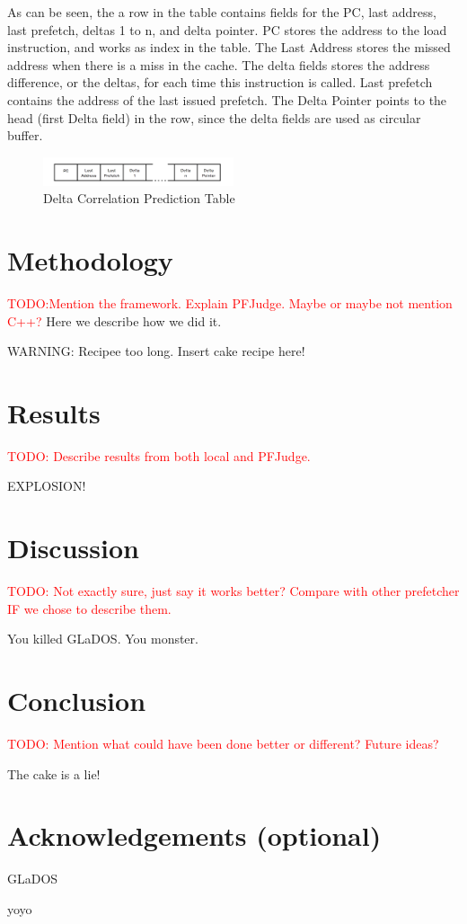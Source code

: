 \documentclass[a4paper]{IEEEtran}
\newcommand\TODO[1]{\textcolor{red}{TODO:#1}}
\newcommand\todo[1]{\TODO{#1}}
\begin{document}
As can be seen, the a row in the table contains fields for the PC, last address, last prefetch, deltas 1 to n, and delta pointer.
PC stores the address to the load instruction, and works as index in the table.
The Last Address stores the missed address when there is a miss in the cache.
The delta fields stores the address difference, or the deltas, for each time this instruction is called.
Last prefetch contains the address of the last issued prefetch.
The Delta Pointer points to the head (first Delta field) in the row, since the delta fields are used as circular buffer.

\begin{figure}[h!]
  \centering
      \includegraphics[width=0.5\textwidth]{Figures/DCTable}
  \caption{Delta Correlation Prediction Table}
  \label{fig:DCTable}
\end{figure}

\section{Methodology}

\todo{Mention the framework. Explain PFJudge. Maybe or maybe not mention C++?}
Here we describe how we did it.

WARNING: Recipee too long. Insert cake recipe here!

\section{Results}

\todo{ Describe results from both local and PFJudge.}



EXPLOSION!

\section{Discussion}

\todo{ Not exactly sure, just say it works better? Compare with other prefetcher IF we chose to describe them. }

You killed GLaDOS.
You monster.

\section{Conclusion}

\todo{ Mention what could have been done better or different? Future ideas? }

The cake is a lie!

\section{Acknowledgements (optional)}

GLaDOS

yoyo \cite{assignment-text}



\nocite{*}
\end{document}
